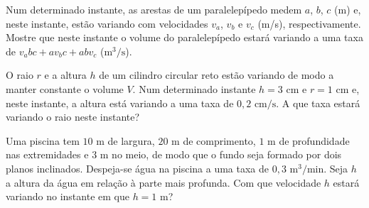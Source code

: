 \begin{exercicio}[12]
Num determinado instante, as arestas de um paralelepípedo medem $a$, $b$, $c$ (m) e, neste instante, estão variando com velocidades $v_a$, $v_b$ e $v_c$ (m/s), respectivamente. Mostre que neste instante o volume do paralelepípedo estará variando a uma taxa de $v_a bc + a v_b c + ab v_c$ ($\text{m}^3\text{/s}$).
\end{exercicio}

\begin{exercicio}[13]
O raio $r$ e a altura $h$ de um cilindro circular reto estão variando de modo a manter constante o volume $V$. Num determinado instante $h = 3\text{ cm}$ e $r = 1\text{ cm}$ e, neste instante, a altura está variando a uma taxa de $0{,}2\text{ cm/s}$. A que taxa estará variando o raio neste instante?
\end{exercicio}

\begin{exercicio}[14]
Uma piscina tem $10\text{ m}$ de largura, $20\text{ m}$ de comprimento, $1\text{ m}$ de profundidade nas extremidades e $3\text{ m}$ no meio, de modo que o fundo seja formado por dois planos inclinados. Despeja-se água na piscina a uma taxa de $0{,}3\text{ m}^3\text{/min}$. Seja $h$ a altura da água em relação à parte mais profunda. Com que velocidade $h$ estará variando no instante em que $h = 1\text{ m}$?

\begin{center}
\end{center}
\end{exercicio}

